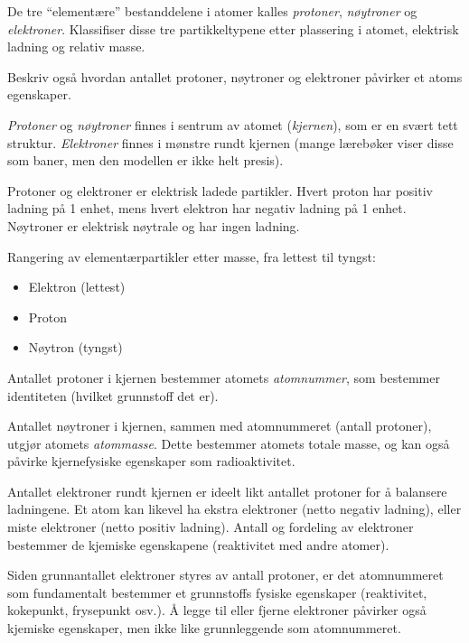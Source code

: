 

De tre ``elementære'' bestanddelene i atomer kalles {\it protoner}, {\it nøytroner} og {\it elektroner}. Klassifiser disse tre partikkeltypene etter plassering i atomet, elektrisk ladning og relativ masse.

Beskriv også hvordan antallet protoner, nøytroner og elektroner påvirker et atoms egenskaper.







{\it Protoner} og {\it nøytroner} finnes i sentrum av atomet ({\it kjernen}), som er en svært tett struktur. {\it Elektroner} finnes i mønstre rundt kjernen (mange lærebøker viser disse som baner, men den modellen er ikke helt presis).

Protoner og elektroner er elektrisk ladede partikler. Hvert proton har positiv ladning på 1 enhet, mens hvert elektron har negativ ladning på 1 enhet. Nøytroner er elektrisk nøytrale og har ingen ladning.

Rangering av elementærpartikler etter masse, fra lettest til tyngst:

\begin{itemize}
\item{} Elektron (lettest)
\item{} Proton
\item{} Nøytron (tyngst)
\end{itemize} 

\vskip 10pt

Antallet protoner i kjernen bestemmer atomets {\it atomnummer}, som bestemmer identiteten (hvilket grunnstoff det er).

Antallet nøytroner i kjernen, sammen med atomnummeret (antall protoner), utgjør atomets {\it atommasse}. Dette bestemmer atomets totale masse, og kan også påvirke kjernefysiske egenskaper som radioaktivitet.

Antallet elektroner rundt kjernen er ideelt likt antallet protoner for å balansere ladningene. Et atom kan likevel ha ekstra elektroner (netto negativ ladning), eller miste elektroner (netto positiv ladning). Antall og fordeling av elektroner bestemmer de kjemiske egenskapene (reaktivitet med andre atomer).

Siden grunnantallet elektroner styres av antall protoner, er det atomnummeret som fundamentalt bestemmer et grunnstoffs fysiske egenskaper (reaktivitet, kokepunkt, frysepunkt osv.). Å legge til eller fjerne elektroner påvirker også kjemiske egenskaper, men ikke like grunnleggende som atomnummeret.










